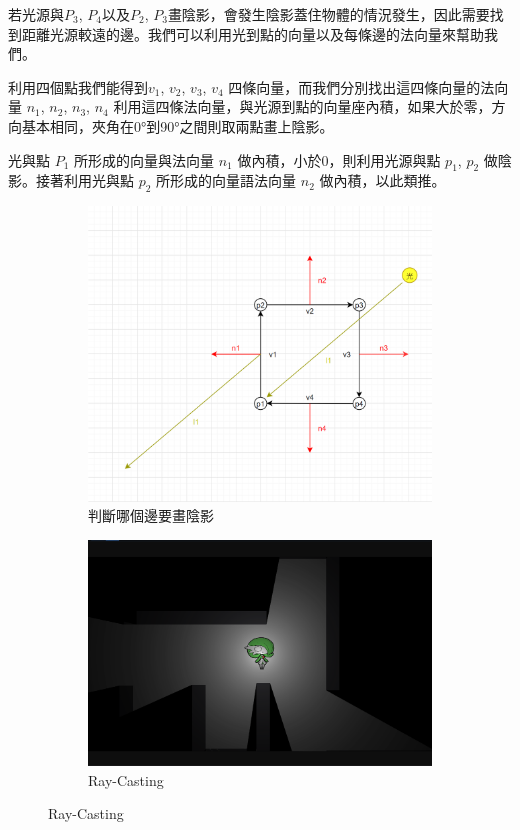 若光源與$P_3$, $P_4$以及$P_2$, $P_3$畫陰影，會發生陰影蓋住物體的情況發生，因此需要找到距離光源較遠的邊。我們可以利用光到點的向量以及每條邊的法向量來幫助我們。

利用四個點我們能得到$v_1$, $v_2$, $v_3$, $v_4$ 四條向量，而我們分別找出這四條向量的法向量 $n_1$, $n_2$, $n_3$, $n_4$ 利用這四條法向量，與光源到點的向量座內積，如果大於零，方向基本相同，夾角在0°到90°之間則取兩點畫上陰影。

光與點 $P_1$ 所形成的向量與法向量 $n_1$ 做內積，小於0，則利用光源與點 $p_1$, $p_2$ 做陰影。接著利用光與點 $p_2$ 所形成的向量語法向量 $n_2$ 做內積，以此類推。

\begin{figure}[h]
    \begin{subfigure}[b]{0.5\linewidth}
        \includegraphics[width=\linewidth]{./resources/2D-Lighting/DrawShadow3.png} 
        \caption{判斷哪個邊要畫陰影}
    \end{subfigure}
    \begin{subfigure}[b]{0.5\linewidth}
        \includegraphics[width=\linewidth]{./resources/2D-Lighting/Ray-Cast.png} 
        \caption{Ray-Casting}
    \end{subfigure}
\caption{Ray-Casting}
\label{fig:RayCasting}
\end{figure}

